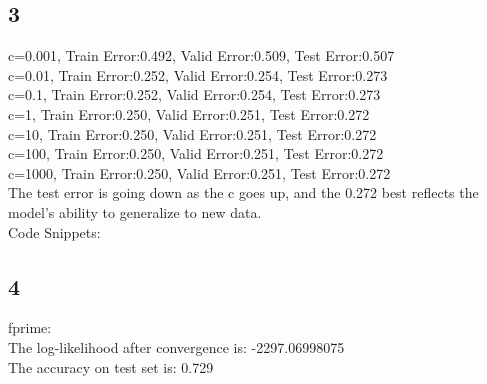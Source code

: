 \documentclass [11pt, a4paper, oneside] {article}
\begin{document}
\subsection *{3}
c=0.001, Train Error:0.492, Valid Error:0.509, Test Error:0.507\\
c=0.01, Train Error:0.252, Valid Error:0.254, Test Error:0.273\\
c=0.1, Train Error:0.252, Valid Error:0.254, Test Error:0.273\\
c=1, Train Error:0.250, Valid Error:0.251, Test Error:0.272\\
c=10, Train Error:0.250, Valid Error:0.251, Test Error:0.272\\
c=100, Train Error:0.250, Valid Error:0.251, Test Error:0.272\\
c=1000, Train Error:0.250, Valid Error:0.251, Test Error:0.272\\
The test error is going down as the c goes up, and the 0.272 best reflects the model's ability to generalize to new data.\\
Code Snippets:

\subsection *{4}
fprime:\\
The log-likelihood after convergence is: -2297.06998075\\
The accuracy on test set is: 0.729\\
\end{document}
